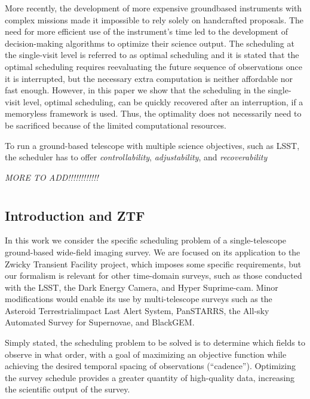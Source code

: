 \documentclass{article}
\begin{document}
More recently, the development of more expensive groundbased instruments with complex missions made it impossible to
rely solely on handcrafted proposals. The need for more
efficient use of the instrument’s time led to the development of decision-making algorithms to optimize their science output.
The scheduling at the single-visit level is referred to as optimal scheduling and it is
stated that the optimal scheduling requires reevaluating the
future sequence of observations once it is interrupted, but the
necessary extra computation is neither affordable nor fast
enough. However, in this paper we show that the scheduling in
the single-visit level, optimal scheduling, can be quickly
recovered after an interruption, if a memoryless framework is
used. Thus, the optimality does not necessarily need to be
sacrificed because of the limited computational resources.

To run a ground-based telescope with multiple science
objectives, such as LSST, the scheduler has to offer
\textit{controllability}, \textit{adjustability}, and \textit{recoverability}


\textit{MORE TO ADD!!!!!!!!!!!!}

\section*{}

\subsection*{Introduction and ZTF}

In this work we consider the specific scheduling problem of
a single-telescope ground-based wide-field imaging survey. We
are focused on its application to the Zwicky Transient Facility
project, which imposes some specific requirements, but our
formalism is relevant for other time-domain surveys, such as
those conducted with the LSST, the Dark Energy Camera, 
and Hyper Suprime-cam. Minor modifications would enable its
use by multi-telescope surveys such as the Asteroid Terrestrialimpact
Last Alert System, PanSTARRS, the All-sky Automated Survey for
Supernovae, and BlackGEM.

Simply stated, the scheduling problem to be solved is to
determine which fields to observe in what order, with a goal of
maximizing an objective function while achieving the desired
temporal spacing of observations (“cadence”). Optimizing the
survey schedule provides a greater quantity of high-quality
data, increasing the scientific output of the survey.
\end{document}
